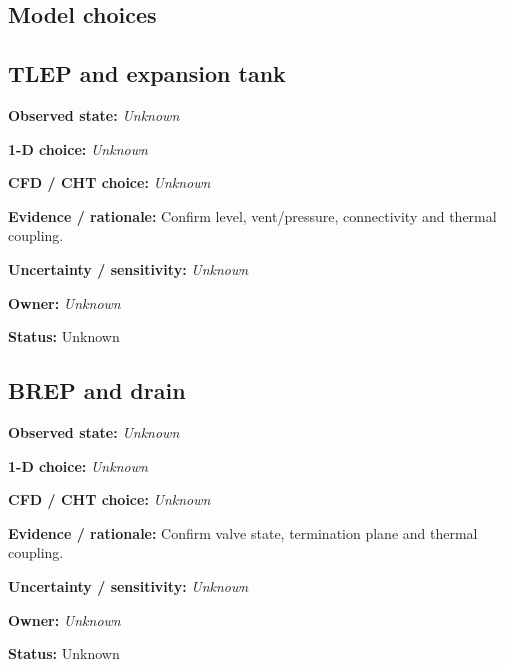 \documentclass[11pt]{article}
\begin{document}
\subsection{Model choices}
\begin{minipage}{\textwidth}\small\setlength{\parskip}{2pt}
\subsection*{TLEP and expansion tank}
\textbf{Observed state:} \textit{Unknown}\par
\textbf{1-D choice:} \textit{Unknown}\par
\textbf{CFD / CHT choice:} \textit{Unknown}\par
\textbf{Evidence / rationale:} Confirm level, vent/pressure, connectivity and thermal coupling.\par
\textbf{Uncertainty / sensitivity:} \textit{Unknown}\par
\textbf{Owner:} \textit{Unknown}\par
\textbf{Status:} Unknown\par
\end{minipage}\par\vspace{5pt}
\begin{minipage}{\textwidth}\small\setlength{\parskip}{2pt}
\subsection*{BREP and drain}
\textbf{Observed state:} \textit{Unknown}\par
\textbf{1-D choice:} \textit{Unknown}\par
\textbf{CFD / CHT choice:} \textit{Unknown}\par
\textbf{Evidence / rationale:} Confirm valve state, termination plane and thermal coupling.\par
\textbf{Uncertainty / sensitivity:} \textit{Unknown}\par
\textbf{Owner:} \textit{Unknown}\par
\textbf{Status:} Unknown\par
\end{minipage}\par\vspace{5pt}
\end{document}

